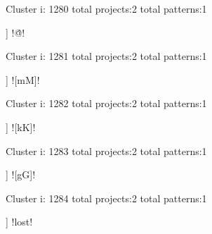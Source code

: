 Cluster i: 1280
total projects:2
total patterns:1
\begin{multicols}{1}
\begin{description}[noitemsep,topsep=0pt]
\item [[2] ] \cverb!\^@!
\end{description}
\end{multicols}







Cluster i: 1281
total projects:2
total patterns:1
\begin{multicols}{1}
\begin{description}[noitemsep,topsep=0pt]
\item [[2] ] \cverb![mM]!
\end{description}
\end{multicols}







Cluster i: 1282
total projects:2
total patterns:1
\begin{multicols}{1}
\begin{description}[noitemsep,topsep=0pt]
\item [[2] ] \cverb![kK]!
\end{description}
\end{multicols}







Cluster i: 1283
total projects:2
total patterns:1
\begin{multicols}{1}
\begin{description}[noitemsep,topsep=0pt]
\item [[2] ] \cverb![gG]!
\end{description}
\end{multicols}







Cluster i: 1284
total projects:2
total patterns:1
\begin{multicols}{1}
\begin{description}[noitemsep,topsep=0pt]
\item [[2] ] \cverb!lost!
\end{description}
\end{multicols}







